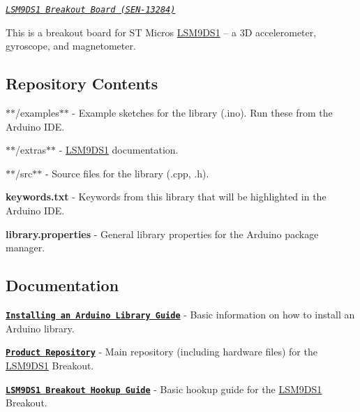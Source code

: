 \href{https://www.sparkfun.com/products/13284}{\tt }

{\itshape \href{https://www.sparkfun.com/products/13284}{\tt L\+S\+M9\+D\+S1 Breakout Board (S\+E\+N-\/13284)}}

This is a breakout board for ST Micro\textquotesingle{}s \hyperlink{class_l_s_m9_d_s1}{L\+S\+M9\+D\+S1} -- a 3D accelerometer, gyroscope, and magnetometer.

\subsection*{Repository Contents }


\begin{DoxyItemize}
\item $\ast$$\ast$/examples$\ast$$\ast$ -\/ Example sketches for the library (.ino). Run these from the Arduino I\+DE.
\item $\ast$$\ast$/extras$\ast$$\ast$ -\/ \hyperlink{class_l_s_m9_d_s1}{L\+S\+M9\+D\+S1} documentation.
\item $\ast$$\ast$/src$\ast$$\ast$ -\/ Source files for the library (.cpp, .h).
\item {\bfseries keywords.\+txt} -\/ Keywords from this library that will be highlighted in the Arduino I\+DE.
\item {\bfseries library.\+properties} -\/ General library properties for the Arduino package manager.
\end{DoxyItemize}

\subsection*{Documentation }


\begin{DoxyItemize}
\item {\bfseries \href{https://learn.sparkfun.com/tutorials/installing-an-arduino-library}{\tt Installing an Arduino Library Guide}} -\/ Basic information on how to install an Arduino library.
\item {\bfseries \href{https://github.com/sparkfun/LSM9DS1_Breakout}{\tt Product Repository}} -\/ Main repository (including hardware files) for the \hyperlink{class_l_s_m9_d_s1}{L\+S\+M9\+D\+S1} Breakout.
\item {\bfseries \href{https://learn.sparkfun.com/tutorials/lsm9ds1-breakout-hookup-guide}{\tt L\+S\+M9\+D\+S1 Breakout Hookup Guide}} -\/ Basic hookup guide for the \hyperlink{class_l_s_m9_d_s1}{L\+S\+M9\+D\+S1} Breakout.
\end{DoxyItemize}


